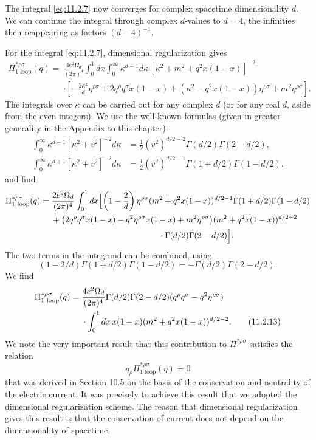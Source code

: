 The integral \eqref{eq:11.2.7} now converges for complex spacetime dimensionality
$d$. We can continue the integral through complex $d$-values to $d=4$,
the infinities then reappearing as factors $(d-4)^{-1}$.

For the integral \eqref{eq:11.2.7}, dimensional regularization gives
\begin{align*}
  \Pi_{\text{1 loop}}^{*\rho\sigma}(q)
  ={}&\frac{4e^2\Omega_d}{(2\pi)^4}\int_0^1dx\int_0^\infty
  \kappa^{d-1}d\kappa\,[\kappa^2+m^2+q^2x(1-x)]^{-2}\\
  &\cdot\left[-\frac{2\kappa^2}{d}\eta^{\rho\sigma}
  +2q^\rho q^\sigma x(1-x)
  +(\kappa^2-q^2x(1-x))\eta^{\rho\sigma}
  +m^2\eta^{\rho\sigma}\right].
\end{align*}
The integrals over $\kappa$ can be carried out for any complex $d$ (or for
any real $d$, aside from the even integers). We use the well-known formulas
(given in greater generality in the Appendix to this chapter):
\begin{align}
  \int_0^\infty\kappa^{d-1}[\kappa^2+v^2]^{-2}d\kappa
  &=\frac12(v^2)^{d/2-2}\Gamma(d/2)\Gamma(2-d/2),
  \tag{11.2.11}\label{eq:11.2.11}\\
  \int_0^\infty\kappa^{d+1}[\kappa^2+v^2]^{-2}d\kappa
  &=\frac12(v^2)^{d/2-1}\Gamma(1+d/2)\Gamma(1-d/2).
  \tag{11.2.12}\label{eq:11.2.12}
\end{align}
and find
\begin{align*}
  \Pi_{\text{1 loop}}^{*\rho\sigma}(q)
  ={}&\frac{2e^2\Omega_d}{(2\pi)^4}\int_0^1dx
  \Bigl[\left(1-\frac2d\right)\eta^{\rho\sigma}
  (m^2+q^2x(1-x))^{d/2-1}
  \Gamma(1+d/2)\Gamma(1-d/2)\\
  &+\bigl(2q^\rho q^\sigma x(1-x)-q^2\eta^{\rho\sigma}x(1-x)
  +m^2\eta^{\rho\sigma}\bigr)
  (m^2+q^2x(1-x))^{d/2-2}\\
  &\hspace{13em}\cdot\Gamma(d/2)\Gamma(2-d/2)\Bigr].
\end{align*}
The two terms in the integrand can be combined, using
\[
  (1-2/d)\Gamma(1+d/2)\Gamma(1-d/2)
  =-\Gamma(d/2)\Gamma(2-d/2).
\]
We find
\begin{align}
  \Pi_{\text{1 loop}}^{*\rho\sigma}(q)
  ={}&\frac{4e^2\Omega_d}{(2\pi)^4}
  \Gamma(d/2)\Gamma(2-d/2)(q^\rho q^\sigma-q^2\eta^{\rho\sigma})
  \notag\\
  &\cdot\int_0^1dx\,x(1-x)(m^2+q^2x(1-x))^{d/2-2}.
  \tag{11.2.13}\label{eq:11.2.13}
\end{align}
We note the very important result that this contribution to
$\Pi^{*\rho\sigma}$ satisfies the relation
\begin{equation}
  q_\rho\Pi_{\text{1 loop}}^{*\rho\sigma}(q)=0
  \tag{11.2.14}\label{eq:11.2.14}
\end{equation}
that was derived in Section 10.5 on the basis of the conservation and
neutrality of the electric current. It was precisely to achieve this result
that we adopted the dimensional regularization scheme. The reason that
dimensional regularization gives this result is that the conservation of
current does not depend on the dimensionality of spacetime.

